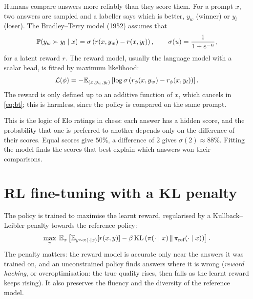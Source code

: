 Humans compare answers more reliably than they score them. For a prompt
$x$, two answers are sampled and a labeller says which is better, $y_w$
(winner) or $y_l$ (loser). The Bradley--Terry model (1952) assumes that
\begin{equation}
  \label{eq:bt}
  \mathbb{P}(y_w \succ y_l \mid x) = \sigma\left( r(x, y_w) - r(x, y_l) \right),
  \qquad \sigma(u) = \frac{1}{1 + e^{-u}},
\end{equation}
for a latent reward $r$. The reward model, usually the language model with
a scalar head, is fitted by maximum likelihood:
\begin{equation}
  \label{eq:rm-loss}
  \mathcal{L}(\phi) = -\mathbb{E}_{(x, y_w, y_l)}\left[ \log \sigma\left( r_\phi(x,
  y_w) - r_\phi(x, y_l) \right) \right].
\end{equation}
The reward is only defined up to an additive function of $x$, which
cancels in \eqref{eq:bt}; this is harmless, since the policy is compared
on the same prompt.

\begin{intuition}
  This is the logic of Elo ratings in chess: each answer has a hidden
  score, and the probability that one is preferred to another depends only
  on the difference of their scores. Equal scores give $50\%$, a
  difference of $2$ gives $\sigma(2) \approx 88\%$. Fitting the model finds
  the scores that best explain which answers won their comparisons.
\end{intuition}

\section{RL fine-tuning with a KL penalty}

The policy is trained to maximise the learnt reward, regularised by a
Kullback--Leibler penalty towards the reference policy:
\begin{equation}
  \label{eq:rlhf-objective}
  \max_\pi\; \mathbb{E}_{x}\left[ \mathbb{E}_{y \sim \pi(\cdot \mid x)}[r(x, y)] - \beta\,
  \mathrm{KL}\left( \pi(\cdot \mid x) \,\|\, \pi_{\mathrm{ref}}(\cdot \mid
  x) \right) \right].
\end{equation}
The penalty matters: the reward model is accurate only near the answers
it was trained on, and an unconstrained policy finds answers where it is
wrong (\emph{reward hacking}, or overoptimisation: the true quality rises,
then falls as the learnt reward keeps rising). It also preserves the
fluency and the diversity of the reference model.

